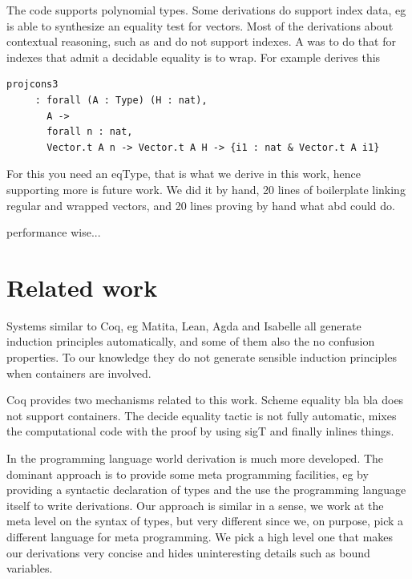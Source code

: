 \documentclass[sigplan,10pt,review]{acmart}\settopmatter{printfolios=true,printccs=false,printacmref=false}
\newcommand{\derive}[1]{\keys{#1}}
\begin{document}
The code supports polynomial types. Some derivations do
support index data, eg \derive{eq} is able to synthesize
an equality test for vectors. Most of the derivations about
contextual reasoning, such as \derive{eqK} and \derive{bcongr}
do not support indexes. A was to do that for indexes that admit a
decidable equality is to wrap. For example \derive{projK} derives
this

\begin{minipage}{\textwidth}\begin{lstlisting}
projcons3
     : forall (A : Type) (H : nat),
       A ->
       forall n : nat,
       Vector.t A n -> Vector.t A H -> {i1 : nat & Vector.t A i1}
\end{lstlisting}\end{minipage}

\noindent
For this you need an eqType, that is what we derive in this work,
hence supporting more is future work. We did it by hand, 20 lines of
boilerplate linking regular and wrapped vectors, and 20 lines proving
by hand what \derive{eqK} abd \derive{bcongr} could do.

performance wise...

\section{Related work} %
\label{sec:related}

Systems similar to Coq, eg Matita, Lean, Agda and Isabelle all generate
induction principles automatically, and some of them also the
no confusion properties. To our knowledge they do not generate
sensible induction principles when containers are involved.

Coq provides two mechanisms related to this work.
Scheme equality bla bla does not support containers.
The decide equality tactic is not fully automatic,
mixes the computational code with the proof by using sigT
and finally inlines things.

In the programming language world derivation is much more developed.
The dominant approach is to provide some meta programming facilities,
eg by providing a syntactic declaration of types and the use the
programming language itself to write derivations. Our approach
is similar in a sense, we work at the meta level on the syntax of
types, but very different since we, on purpose, pick a different
language for meta programming. We pick a high level one that makes
our derivations very concise and hides uninteresting details such
as bound variables.
\end{document}
